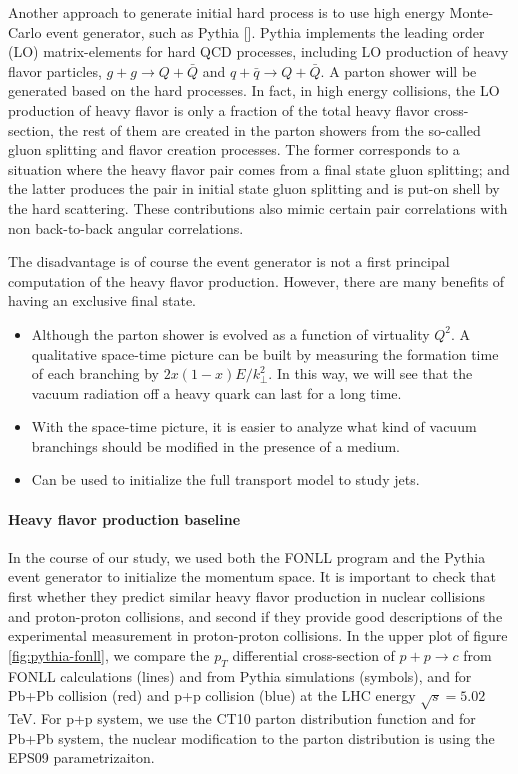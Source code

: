 Another approach to generate initial hard process is to use high energy Monte-Carlo event generator, such as Pythia [].
Pythia implements the leading order (LO) matrix-elements for hard QCD processes, including LO production of heavy flavor particles,
$g+g\rightarrow Q+\bar{Q}$ and $q+\bar{q}\rightarrow Q+\bar{Q}$.
A parton shower will be generated based on the hard processes.
In fact, in high energy collisions, the LO production of heavy flavor is only a fraction of the total heavy flavor cross-section, the rest of them are created in the parton showers from the so-called gluon splitting and flavor creation processes.
The former corresponds to a situation where the heavy flavor pair comes from a final state gluon splitting; and the latter produces the pair in initial state gluon splitting and is put-on shell by the hard scattering.
These contributions also mimic certain pair correlations with non back-to-back angular correlations.

The disadvantage is of course the event generator is not a first principal computation of the heavy flavor production.
However, there are many benefits of having an exclusive final state.
\begin{itemize}
\item Although the parton shower is evolved as a function of virtuality $Q^2$. A qualitative space-time picture can be built by measuring the formation time of each branching by $2x(1-x)E/k_\perp^2$. In this way, we will see that the vacuum radiation off a heavy quark can last for a long time.
\item With the space-time picture, it is easier to analyze what kind of vacuum branchings should be modified in the presence of a medium.
\item Can be used to initialize the full transport model to study jets. 
\end{itemize}

\paragraph{Heavy flavor production baseline} In the course of our study, we used both the FONLL program and the Pythia event generator to initialize the momentum space. 
It is important to check that first whether they predict similar heavy flavor production in nuclear collisions and proton-proton collisions, and second if they provide good descriptions of the experimental measurement in proton-proton collisions.
In the upper plot of figure \ref{fig:pythia-fonll}, we compare the $p_T$ differential cross-section of $p+p\rightarrow c$ from FONLL calculations (lines) and from Pythia simulations (symbols), and for Pb+Pb collision (red) and p+p collision (blue) at the LHC energy $\sqrt{s}=5.02$ TeV.
For p+p system, we use the CT10 parton distribution function and for Pb+Pb system, the nuclear modification to the parton distribution is using the EPS09 parametrizaiton.

